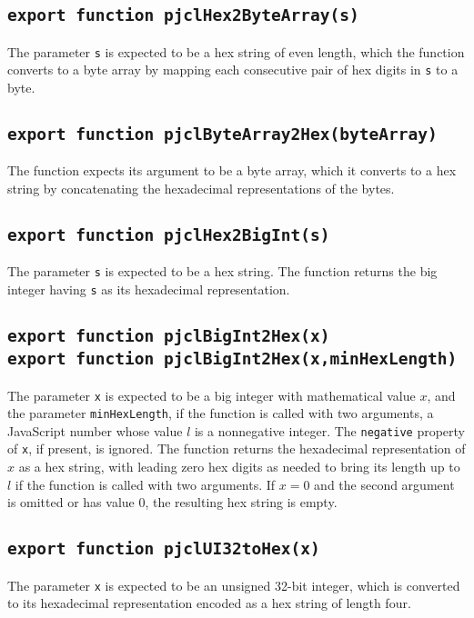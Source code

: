 \documentclass[12pt]{article}
\begin{document}
\subsection{\tt export function pjclHex2ByteArray(s)}

The parameter {\tt s} is expected to be a hex string of even length, which the
function converts to a byte array by mapping each consecutive pair of
hex digits in {\tt s} to a byte.

\subsection{\tt export function pjclByteArray2Hex(byteArray)}

The function expects its argument to be a byte array, which it converts to a hex string 
by concatenating the hexadecimal representations of the bytes.

\subsection{\tt export function pjclHex2BigInt(s)}

The parameter {\tt s} is expected to be a hex string.  The function
returns the big integer having {\tt s} as its hexadecimal representation.

\subsection{\tt export function pjclBigInt2Hex(x)\\export function pjclBigInt2Hex(x,minHexLength)}

The parameter {\tt x} is expected to be a big integer with mathematical value $x$,
and the parameter {\tt minHexLength}, if the function is called with two
arguments, a JavaScript number whose value $l$ is a nonnegative integer.
The {\tt negative} property of {\tt x}, if present, is ignored.
The function returns the hexadecimal representation of $x$ as a hex string,
with leading zero hex digits as needed to bring its length up to $l$ if
the function is called with two arguments.
If $x = 0$ and the second argument is omitted or has value 0, the resulting hex string is empty.

\subsection{\tt export function pjclUI32toHex(x)}

The parameter {\tt x} is expected to be an unsigned 32-bit integer, which is
converted to its hexadecimal representation encoded as a hex string of length four.
\end{document}
